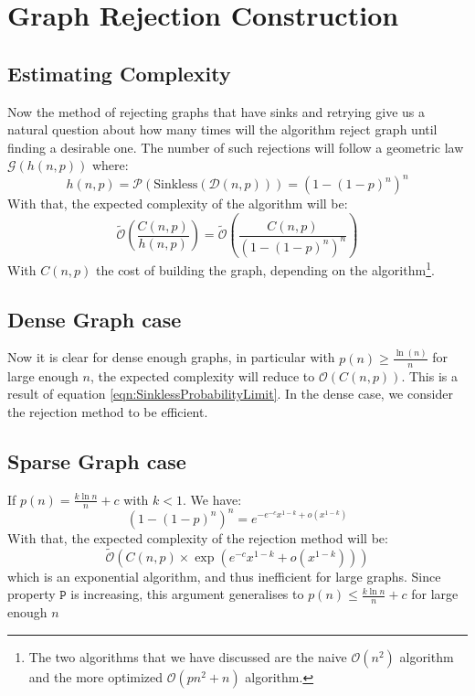 \section{Graph Rejection Construction}
\subsection{Estimating Complexity}
Now the method of rejecting graphs that have sinks and retrying give us a natural question about how many times will the algorithm reject graph until finding a desirable one.\newline
The number of such rejections will follow a geometric law $\mathcal{G}(h(n,p))$ where: $$
h(n,p)=\mathscr{P}\left(\text{Sinkless}(\mathcal{D}(n,p))\right)=(1-(1-p)^n)^n
$$
\newline With that, the expected complexity of the algorithm will be:
$$
\tilde{\mathcal{O}}\left(\frac{C(n,p)}{h(n,p)}\right)=\tilde{\mathcal{O}}\left(\frac{C(n,p)}{(1-(1-p)^n)^n}\right)
$$
With $C(n,p)$ the cost of building the graph, depending on the algorithm\footnote{The two algorithms that we have discussed are the naive $\mathcal{O}(n^2)$ algorithm and the more optimized $\mathcal{O}(pn^2+n)$ algorithm.}.
\subsection{Dense Graph case}
Now it is clear for dense enough graphs, in particular with $p(n) \ge \frac{\ln (n)}{n}$ for large enough $n$, the expected complexity will reduce to $\mathcal{O}(C(n,p))$. This is a result of equation \eqref{eqn:SinklessProbabilityLimit}.
\newline In the dense case, we consider the rejection method to be efficient.
\subsection{Sparse Graph case}
If $p(n)=\frac{k\ln n}{n}+c$ with $k<1.$ We have:
$$
(1-(1-p)^n)^n=e^{-e^{-c}x^{1-k}+o(x^{1-k})}
$$
With that, the expected complexity of the rejection method will be:
$$
\tilde{\mathcal{O}}\left(C(n,p)\times \exp\left(e^{-c}x^{1-k}+o(x^{1-k})\right)\right)
$$
which is an exponential algorithm, and thus inefficient for large graphs.
Since property $\mathtt{P}$ is increasing, this argument generalises to $p(n) \le \frac{k\ln n}{n}+c$ for large enough $n$
